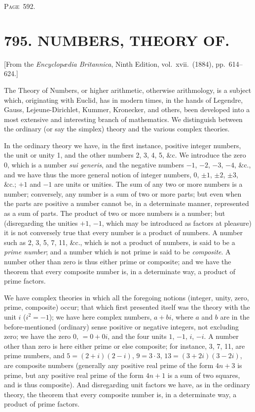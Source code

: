 \documentclass[11pt,a4paper]{article}
\theoremstyle{definition}
\begin{document}
\newpage
\noindent\textsc{Page~592.}

\section*{795. NUMBERS, THEORY OF.}

\begin{flushright}
\small[From the \textit{Encyclop{\ae}dia Britannica}, Ninth Edition, vol.~xvii.~(1884), pp.~614--624.]
\end{flushright}

The Theory of Numbers, or higher arithmetic, otherwise arithmology, is a subject which, originating with Euclid, has in modern times, in the hands of Legendre, Gauss, Lejeune-Dirichlet, Kummer, Kronecker, and others, been developed into a most extensive and interesting branch of mathematics. We distinguish between the ordinary (or say the simplex) theory and the various complex theories.

In the ordinary theory we have, in the first instance, positive integer numbers, the unit or unity 1, and the other numbers 2, 3, 4, 5, \&c. We introduce the zero 0, which is a number \textit{sui generis}, and the negative numbers $-1$, $-2$, $-3$, $-4$, \&c., and we have thus the more general notion of integer numbers, 0, $\pm 1$, $\pm 2$, $\pm 3$, \&c.; $+1$ and $-1$ are units or unities. The sum of any two or more numbers is a number; conversely, any number is a sum of two or more parts; but even when the parts are positive a number cannot be, in a determinate manner, represented as a sum of parts. The product of two or more numbers is a number; but (disregarding the unities $+1$, $-1$, which may be introduced as factors at pleasure) it is not conversely true that every number is a product of numbers. A number such as 2, 3, 5, 7, 11, \&c., which is not a product of numbers, is said to be a \textit{prime number}; and a number which is not prime is said to be \textit{composite}. A number other than zero is thus either prime or composite; and we have the theorem that every composite number is, in a determinate way, a product of prime factors.

We have complex theories in which all the foregoing notions (integer, unity, zero, prime, composite) occur; that which first presented itself was the theory with the unit $i$ ($i^2=-1$); we have here complex numbers, $a+bi$, where $a$ and $b$ are in the before-mentioned (ordinary) sense positive or negative integers, not excluding zero; we have the zero $0$, $=0+0i$, and the four units $1$, $-1$, $i$, $-i$. A number other than zero is here either prime or else composite; for instance, 3, 7, 11, are prime numbers, and $5=(2+i)(2-i)$, $9=3\cdot 3$, $13=(3+2i)(3-2i)$, are composite numbers (generally any positive real prime of the form $4n+3$ is prime, but any positive real prime of the form $4n+1$ is a sum of two squares, and is thus composite). And disregarding unit factors we have, as in the ordinary theory, the theorem that every composite number is, in a determinate way, a product of prime factors.
\end{document}
